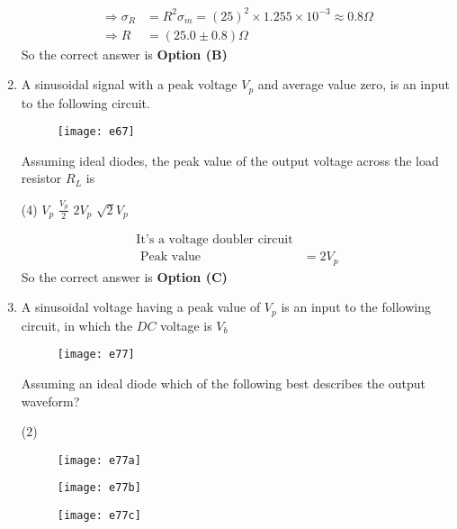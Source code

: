 \begin{enumerate}
\begin{answer}
\begin{align*}
\Rightarrow \sigma_{R}&=R^{2} \sigma_{m}=(25)^{2} \times 1.255 \times 10^{-3} \approx 0.8 \Omega \\\Rightarrow R&=(25.0 \pm 0.8) \Omega
\end{align*}
So the correct answer is \textbf{Option (B)}
\end{answer}
\item A sinusoidal signal with a peak voltage $V_{p}$ and average value zero, is an input to the following circuit.\\
\begin{figure}[H]
	\centering
	\texttt{[image: e67]}
\end{figure}
Assuming ideal diodes, the peak value of the output voltage across the load resistor $R_{L}$ is
{}
\begin{tasks}(4)
\task[\textbf{A.}] $V_{p}$
\task[\textbf{B.}] $\frac{V_{p}}{2}$
\task[\textbf{C.}]  $2 V_{p}$
\task[\textbf{D.}]  $\sqrt{2} V_{p}$
\end{tasks}
\begin{answer}
\begin{align*}
\text{It's a voltage doubler circuit}\\
\text{	Peak value }&=2 V_{p}
\end{align*}
So the correct answer is \textbf{Option (C)}
\end{answer}
\item A sinusoidal voltage having a peak value of $V_ p$ is an input to the following circuit, in which the $DC$ voltage is $V_b$ \\
\begin{figure}[H]
	\centering
	\texttt{[image: e77]}
\end{figure}
Assuming an ideal diode which of the following best describes the output waveform?
{}
\begin{tasks}(2)
\task[\textbf{A.}] \begin{figure}[H]
	\centering
	\texttt{[image: e77a]}
\end{figure}
\task[\textbf{B.}] \begin{figure}[H]
	\centering
	\texttt{[image: e77b]}
\end{figure}
\task[\textbf{C.}] \begin{figure}[H]
	\centering
	\texttt{[image: e77c]}
\end{figure}
\task[\textbf{D.}] \begin{figure}[H]

\end{figure}
\end{tasks}
\end{enumerate}
